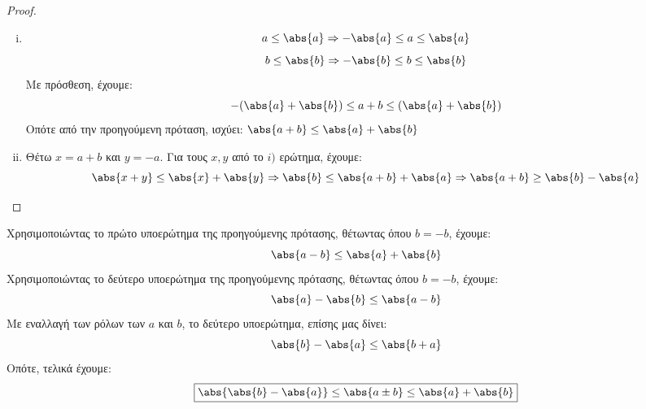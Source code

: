 \documentclass[main.tex]{subfiles}
\begin{document}
    \begin{proof}
    \item {}
        \begin{enumerate}[i)]
            \item \[ a \leq \abs{a} \Rightarrow - \abs{a} \leq a \leq \abs{a}
        \] 
        \[
            b \leq \abs{b} \Rightarrow - \abs{b} \leq b \leq \abs{b} 
         \] 
         Με πρόσθεση, έχουμε: 
         \[
             - (\abs{a} + \abs{b} ) \leq a + b \leq ( \abs{a} + \abs{b}) 
          \] 
Οπότε από την προηγούμενη πρόταση, ισχύει:
$ \abs{a+b} \leq \abs{a} + \abs{b} $
\item Θέτω $ x = a+b $ και $ y = -a $. Για τους $ x,y $ από το $ i) $ 
    ερώτημα, έχουμε:
    \[
        \abs{x+y} \leq \abs{x} + \abs{y} \Rightarrow \abs{b} \leq 
        \abs{a+b} + \abs{a} \Rightarrow \abs{a+b} \geq \abs{b} - \abs{a}
     \] 
\end{enumerate} 
\end{proof} 

\begin{rem}
    Χρησιμοποιώντας το πρώτο υποερώτημα της προηγούμενης πρότασης, θέτωντας
    όπου $ b = -b $, έχουμε:
    \[
        \abs{a-b} \leq \abs{a} + \abs{b} 
     \] 
    Χρησιμοποιώντας το δεύτερο υποερώτημα της προηγούμενης πρότασης, θέτωντας
    όπου $ b = -b $, έχουμε:
\[
    \abs{a} - \abs{b} \leq \abs{a-b} 
 \]
 Με εναλλαγή των ρόλων των $ a $ και $ b $, το δεύτερο υποερώτημα, επίσης 
 μας δίνει:
 \[
     \abs{b} - \abs{a} \leq \abs{b+a} 
  \] 
Οπότε, τελικά έχουμε:
\[
    \boxed{\abs{\abs{b} - \abs{a}} \leq \abs{a \pm b} \leq \abs{a} + \abs{b}  }
 \]
 
\end{rem}
\end{document}
